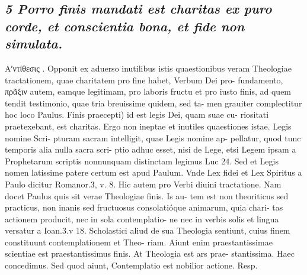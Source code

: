 \documentclass{article}
\begin{document}
\begin{pages}
\subsection*{\textit{5 Porro finis mandati est charitas ex puro corde, et conscientia bona, et fide non simulata. }}\pstart Αʹντίθεσις . Opponit ex aduerso inutilibus istis quaestionibus veram Theologiae tractationem, quae charitatem pro fine habet, Verbum Dei pro- fundamento, πρᾶξιν autem, eamque legitimam, pro laboris fructu et pro iusto finis, ad quem tendit testimonio, quae tria breuissime quidem, sed ta- men grauiter complectitur hoc loco Paulus.  \pend\pstart Finis praecepti) id est legis Dei, quam suae cu- riositati praetexebant, est charitas. Ergo non ineptae et inutiles quaestiones istae. Legis nomine Scri- pturam sacram intelligit, quae Legis nomine ap- pellatur, quod tunc temporis alia nulla sacra scri- ptio adhuc esset, nisi de Lege, etsi Legem ipsam a Prophetarum scriptis nonnunquam distinctam legimus Luc 24. Sed et Legis nomen latissime patere certum est apud Paulum. Vnde Lex fidei et Lex Spiritus a Paulo dicitur Romanor.3, v. 8. Hic autem pro Verbi diuini tractatione. Nam docet Paulus quis sit verae Theologiae finis. Is au- tem est non theoriticus sed practicus, non inanis sed fructuosus consolatióque  animarum, quia chari- tas actionem producit, nec in sola contemplatio- ne nec in verbis solis et lingua versatur a Ioan.3.v 18. Scholastici aliud de sua Theologia sentiunt, cuius finem constituunt contemplationem et Theo- riam. Aiunt enim praestantissimae scientiae est praestantissimus finis. At Theologia est ars prae- stantissima. Haec concedimus. Sed quod aiunt,  \pend\pstart Contemplatio est nobilior actione. Resp.  \pend

\end{pages}
\end{document}
